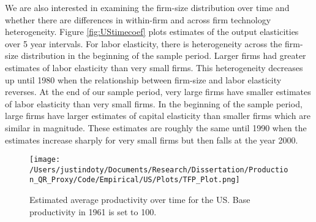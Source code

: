 \documentclass[11pt]{article}
\begin{document}
We are also interested in examining the firm-size distribution over time and whether there are differences in within-firm and across firm technology heterogeneity. Figure \ref{fig:UStimecoef} plots estimates of the output elasticities over 5 year intervals. For labor elasticity, there is heterogeneity across the firm-size distribution in the beginning of the sample period. Larger firms had greater estimates of labor elasticity than very small firms. This heterogeneity decreases up until 1980 when the relationship between firm-size and labor elasticity reverses. At the end of our sample period, very large firms have smaller estimates of labor elasticity than very small firms. In the beginning of the sample period, large firms have larger estimates of capital elasticity than smaller firms which are similar in magnitude. These estimates are roughly the same until 1990 when the estimates increase sharply for very small firms but then falls at the year 2000.


\begin{figure}[H]
\centering
\texttt{[image: /Users/justindoty/Documents/Research/Dissertation/Production\_QR\_Proxy/Code/Empirical/US/Plots/TFP\_Plot.png]}
\caption{Estimated average productivity over time for the US. Base productivity in 1961 is set to 100.}
\label{fig:USpgrowth}
\end{figure}


\end{document}
